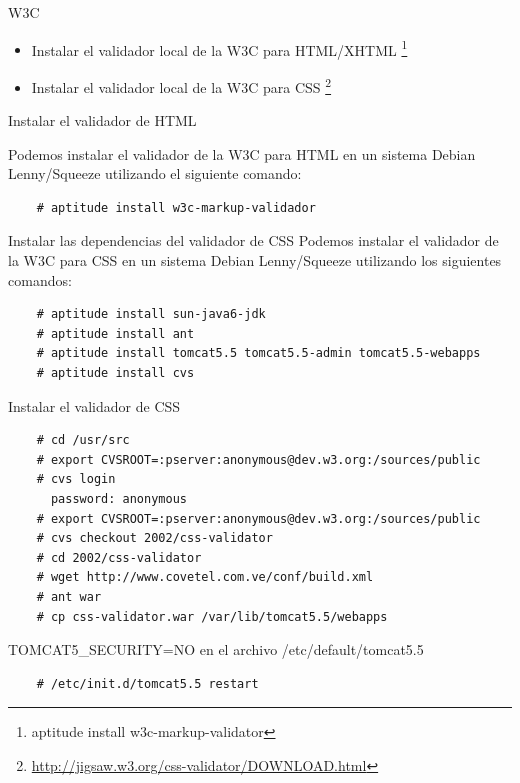 \documentclass{beamer}
\begin{document}
\begin{frame}{W3C} %
    \begin{center}
    \begin{itemize}
        \item Instalar el validador local de la W3C para HTML/XHTML
        \footnote{aptitude install w3c-markup-validator} 
        \item Instalar el validador local de la W3C para CSS \footnote{\url{http://jigsaw.w3.org/css-validator/DOWNLOAD.html}}
    \end{itemize}
    \end{center}
\end{frame}

\begin{frame}[fragile]{Instalar el validador de HTML} %
    \begin{center}
    Podemos instalar el validador de la W3C para HTML en un sistema Debian
    Lenny/Squeeze utilizando el siguiente comando:
    \begin{verbatim}
    # aptitude install w3c-markup-validador
    \end{verbatim}
    \end{center}
\end{frame}

\begin{frame}[fragile]{Instalar las dependencias del validador de CSS} %
    Podemos instalar el validador de la W3C para CSS en un sistema Debian
    Lenny/Squeeze utilizando los siguientes comandos:
    {\footnotesize
    \begin{verbatim}
    # aptitude install sun-java6-jdk 
    # aptitude install ant 
    # aptitude install tomcat5.5 tomcat5.5-admin tomcat5.5-webapps
    # aptitude install cvs 
    \end{verbatim}
    }
\end{frame} 

\begin{frame}[fragile]{Instalar el validador de CSS} %

    {\footnotesize 
    \begin{verbatim}
    # cd /usr/src 
    # export CVSROOT=:pserver:anonymous@dev.w3.org:/sources/public 
    # cvs login 
      password: anonymous
    # export CVSROOT=:pserver:anonymous@dev.w3.org:/sources/public 
    # cvs checkout 2002/css-validator
    # cd 2002/css-validator 
    # wget http://www.covetel.com.ve/conf/build.xml
    # ant war 
    # cp css-validator.war /var/lib/tomcat5.5/webapps 
    \end{verbatim}
    }
    TOMCAT5\_SECURITY=NO en el archivo /etc/default/tomcat5.5\\[0.5cm]

    \begin{verbatim}
    # /etc/init.d/tomcat5.5 restart
    \end{verbatim}

\end{frame}
\end{document}
